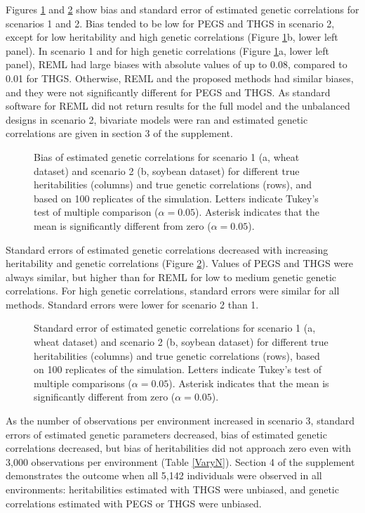 \documentclass{bmcart}
\def\texttt{[image: ]}
\begin{document}
Figures \ref{GCBIAS} and \ref{GCSE} show bias and standard error of estimated genetic correlations for scenarios 1 and 2.  Bias tended to be low for PEGS and THGS in scenario 2, except for low heritability and high genetic correlations (Figure \ref{GCBIAS}b, lower left panel). In scenario 1 and for high genetic correlations (Figure \ref{GCBIAS}a, lower left panel), REML had large biases with absolute values of up to 0.08, compared to 0.01 for THGS. Otherwise, REML and the proposed methods had similar biases, and they were not significantly different for PEGS and THGS. As standard software for REML did not return results for the full model and the  unbalanced designs in scenario 2, bivariate models were ran and estimated genetic correlations are given in section 3 of the supplement.

\begin{figure}%
  \caption{\small{Bias of estimated genetic correlations for scenario 1 (a, wheat dataset) and scenario 2 (b, soybean dataset) for different true heritabilities (columns) and true genetic correlations (rows), and based on 100 replicates of the simulation. Letters indicate Tukey's test of multiple comparison ($\alpha=0.05$). Asterisk indicates that the mean is significantly different from zero ($\alpha=0.05$).}}
  \label{GCBIAS}
\end{figure}

Standard errors of estimated genetic correlations decreased with increasing heritability and genetic correlations (Figure \ref{GCSE}). Values of PEGS and THGS were always similar, but higher than for REML for low to medium genetic genetic correlations. For high genetic correlations, standard errors were similar for all methods. Standard errors were lower for scenario 2 than 1.

\begin{figure}%
  \caption{\small{Standard error of estimated genetic correlations for scenario 1 (a, wheat dataset) and scenario 2 (b, soybean dataset) for different true heritabilities (columns) and true genetic correlations (rows), based on 100 replicates of the simulation. Letters indicate Tukey's test of multiple comparisons ($\alpha=0.05$). Asterisk indicates that the mean is significantly different from zero ($\alpha=0.05$).}}
  \label{GCSE}
\end{figure}

As the number of observations per environment increased in scenario 3, standard errors of estimated genetic parameters decreased, bias of estimated genetic correlations decreased, but bias of heritabilities did not approach zero even with 3,000 observations per environment (Table \ref{VaryN}). Section 4 of the supplement demonstrates the outcome when all 5,142 individuals were observed in all environments: heritabilities estimated with THGS were unbiased, and genetic correlations estimated with PEGS or THGS were unbiased.
\end{document}
